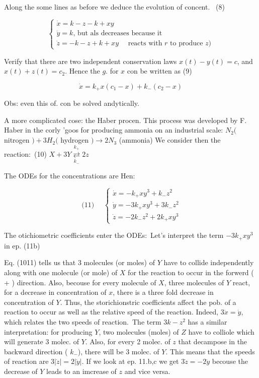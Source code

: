 Along the some lines as before we deduce the evolution of concent. \
(8)

$$ 
 \left\{ \begin{array}{l}
\dot{x}=k-z-k+x y \\
\dot{y}=k \text {, but als decreases because it} \\
\dot{z}=-k-z+k+x y \quad \text { reacts with } r \text { to produce } z) 
\end{array}\right. 
$$ 

Verify that there are two independent conservation laws $x(t)-y(t)=c$, and $x(t)+z(t)=c_{2}$. Hence the $g$. for $x$ con be written as
\n(9)

$$ 
\dot{x}=k_{+} x\left(c_{1}-x\right)+k_{-}\left(c_{2}-x\right) 
$$ 

Obs: even this of. con be solved andytically.

A more complicated cose: the Haber procen. This process was developed by F. Haber in the corly 'goos for producing ammonia on an industrial scale: $N_{2}($ nitrogen $)+3 H_{2}($ hydrogen $) \longrightarrow 2 N_{3}$ (ammonia) We consider then the reaction:\
(10) $X+3 Y \underset{k_{-}}{\stackrel{k_{+}}{\rightleftarrows}} 2 z$

The ODEs for the concentrations are Hen:

\[ 
 \text { (11) } \quad\left\{\begin{array}{l}
\dot{x}=-k_{+} x y^{3}+k_{-} z^{2} \quad \tag{a)}\\
\dot{y}=-3 k_{+} x y^{3}+3 k_{-} z^{2} \\
\dot{z}=-2 k_{-} z^{2}+2 k_{+} x y^{3}
\end{array}\right.
\] 

The otichiometric coefficients enter the ODEs:\
Let's interpret the term $-3 k_{+} x y^{3}$ in ep. (11b)

Eq. (1011) tells us that 3 molecules (or moles) of $Y$ have to collide independently along with one molecule (or mole) of $X$ for the reaction to occur in the forwerd ( + ) direction. Also, becouse for every molecule of $X$, three molecules of $Y$ react, for a decrease in concentration of $x$, there is a three fold decrease in concentration of $Y$. Thus, the storichionstric coefficients affect the pob. of a reaction to occur as well as the relative speed of the reaction. Indeed, $3 \dot{x}=\dot{y}$, which relates the two speeds of reaction.\
The term $3 k-z^{2}$ has a similar interpretation: for producing $Y$, two molecules (moles) of $Z$ have to colliole which will generate 3 molec. of $Y$. Also, for every 2 molec. of $z$ that decampose in the backward direction ( $k_{-}$), there will be 3 molec. of $Y$. This means that the speeds of reaction are $3|\dot{z}|=2|\dot{y}|$. If we look at ep. 11.b,c we get $3 \dot{z}=-2 \dot{y}$ becouse the decrease of $Y$ leads to an imcrease of $z$ and vice versa.

